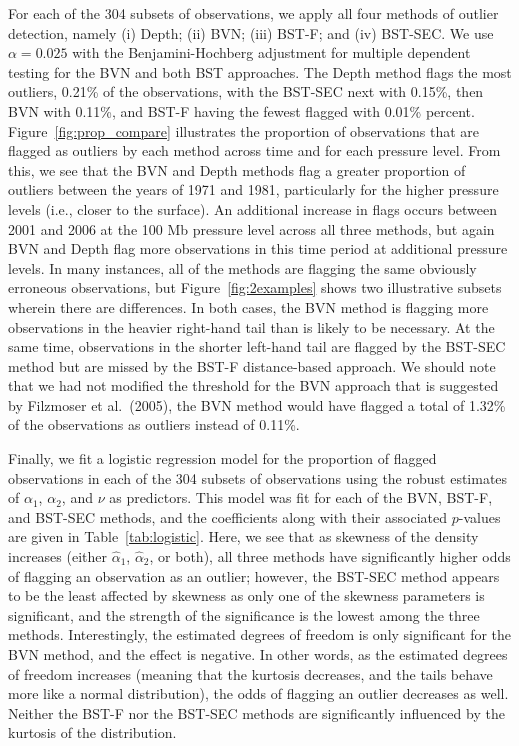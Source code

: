 \documentclass[12pt]{article}
\begin{document}
\begin{doublespacing}
For each of the 304 subsets of observations, we apply all four methods of outlier detection, namely (i) Depth; (ii) BVN; (iii) BST-F; and (iv) BST-SEC.  We use $\alpha=0.025$ with the Benjamini-Hochberg adjustment for multiple dependent testing for the BVN and both BST approaches.  The Depth method flags the most outliers, 0.21\% of the observations, with the BST-SEC next with 0.15\%, then BVN with 0.11\%, and BST-F having the fewest flagged with 0.01\% percent.  Figure~\ref{fig:prop_compare} illustrates the proportion of observations that are flagged as outliers  by each method across time and for each pressure level.  From this, we see that the BVN and Depth methods flag a greater proportion of outliers between the years of 1971 and 1981, particularly for the higher pressure levels (i.e., closer to the surface).  An additional increase in flags occurs between 2001 and 2006 at the 100 Mb pressure level across all three methods, but again BVN and Depth flag more observations in this time period at additional pressure levels.  In many instances, all of the methods are flagging the same obviously erroneous observations, but Figure~\ref{fig:2examples}  shows two illustrative subsets wherein there are differences.  In both cases, the BVN method is flagging more observations in the heavier right-hand tail than is likely to be necessary.  At the same time, observations in the shorter left-hand tail are flagged by the BST-SEC method but are missed by the BST-F distance-based approach.  We should note that we had not modified the threshold for the BVN approach that is suggested by Filzmoser et al.~(2005), the BVN method would have flagged a total of 1.32\% of the observations as outliers instead of 0.11\%.
 
 
Finally, we fit a logistic regression model for the proportion of flagged observations in each of the 304 subsets of observations using the robust estimates of $\alpha_1$, $\alpha_2$, and $\nu$ as predictors.   This model was fit for each of the BVN, BST-F, and BST-SEC methods, and the coefficients along with their associated $p$-values are given in Table~\ref{tab:logistic}.  Here, we see that as skewness of the density increases (either $\hat\alpha_1$, $\hat\alpha_2$, or both),  all three methods have significantly higher odds of flagging an observation as an outlier; however, the BST-SEC method appears to be the least affected by skewness as only one of the skewness parameters is significant, and the strength of the significance is the lowest among the three methods.  Interestingly, the estimated degrees of freedom is only significant for the BVN method, and the effect is negative.  In other words, as the estimated degrees of freedom increases (meaning that the kurtosis decreases, and the tails behave more like a normal distribution), the odds of flagging an outlier decreases as well.  Neither the BST-F nor the BST-SEC methods are  significantly influenced by the kurtosis of the distribution.  


\end{doublespacing}
\end{document}
